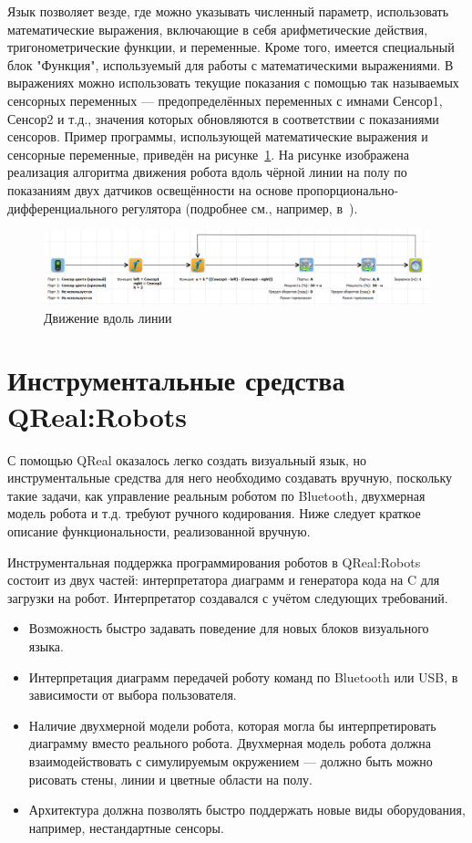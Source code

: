 \documentclass[a4paper]{article}
\begin{document}
Язык позволяет везде, где можно указывать численный параметр, использовать математические выражения, включающие в себя арифметические действия, тригонометрические функции, и переменные. Кроме того, имеется специальный блок "Функция", используемый для работы с математическими выражениями. В выражениях можно использовать текущие показания с помощью так называемых сенсорных переменных --- предопределённых переменных с имнами Сенсор1, Сенсор2 и т.д., значения которых обновляются в соответствии с показаниями сенсоров. Пример программы, использующей математические выражения и сенсорные переменные, приведён на рисунке~\ref{movingAlongTheLine}. На рисунке изображена реализация алгоритма движения робота вдоль чёрной линии на полу по показаниям двух датчиков освещённости на основе пропорционально-дифференциального регулятора (подробнее см., например, в~\cite{filippov}).

\begin{figure} [ht]
  \begin{center}
    \includegraphics[width=\textwidth]{movingAlongTheLine.png}
    \caption{Движение вдоль линии}
    \label{movingAlongTheLine}
  \end{center}
\end{figure}

\section{Инструментальные средства QReal:Robots}
С помощью QReal оказалось легко создать визуальный язык, но инструментальные средства для него необходимо создавать вручную, поскольку такие задачи, как управление реальным роботом по Bluetooth, двухмерная модель робота и т.д. требуют ручного кодирования. Ниже следует краткое описание функциональности, реализованной вручную.

Инструментальная поддержка программирования роботов в QReal:Robots состоит из двух частей: интерпретатора диаграмм и генератора кода на C для загрузки на робот. Интерпретатор создавался с учётом следующих требований.
\begin{itemize}
  \item Возможность быстро задавать поведение для новых блоков визуального языка.
  \item Интерпретация диаграмм передачей роботу команд по Bluetooth или USB, в зависимости от выбора пользователя.
  \item Наличие двухмерной модели робота, которая могла бы интерпретировать диаграмму вместо реального робота. Двухмерная модель робота должна взаимодействовать с симулируемым окружением --- должно быть можно рисовать стены, линии и цветные области на полу.
  \item Архитектура должна позволять быстро поддержать новые виды оборудования, например, нестандартные сенсоры.
\end{itemize}
\end{document}
